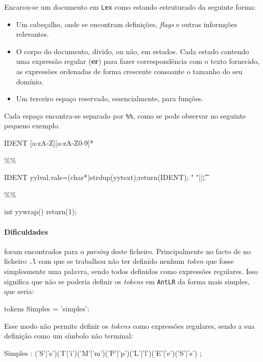 \documentclass[11pt,a4paper]{article}
\begin{document}
Encarou-se um documento em \texttt{Lex} como estando estruturado da seguinte forma:\\

\begin{itemize}
 \item Um cabeçalho, onde se encontram definições, \emph{flags} e outras informções relevantes.
 \item O corpo do documento, divido, ou não, em estados. Cada estado contendo uma expressão regular (\textbf{er}) para fazer correspondência com o texto fornecido, as expressões
 ordenadas de forma crescente consoante o tamanho do seu domínio.
 \item Um terceiro espaço reservado, essencialmente, para funções.
\end{itemize}

Cada espaço encontra-se separado por \texttt{\%\%}, como se pode observar no seguinte pequeno exemplo.\\

\begin{code_txt}
IDENT           [a-zA-Z][a-zA-Z0-9]*

\%\%

{IDENT}                 {yylval.vals=(char*)strdup(yytext);return(IDENT);}
" "|\n|\t               {;}

\%\%

int yywrap()
{ return(1); }

\end{code_txt}

\paragraph{Dificuldades} foram encontrados para o \emph{parsing} deste ficheiro. Principalmente no facto de no ficheiro \texttt{.l} com que se trabalhou não ter definido 
nenhum \emph{token} que fosse simplesmente uma palavra, sendo todos definidos como expressões regulares. Isso significa que não se poderia definir os \emph{tokens} em \texttt{AntLR}
da forma mais simples, que seria:\\

\begin{code_txt}
tokens{
	Simples = 'simples';
}
\end{code_txt}
Esse modo não permite definir os \emph{tokens} como expressões regulares, sendo a sua definição como um símbolo não terminal:\\

\begin{code_txt}
Simples	:	('S'|'s')('I'|'i')('M'|'m')('P'|'p')('L'|'l')('E'|'e')('S'|'s')
	;
\end{code_txt}
\end{document}
